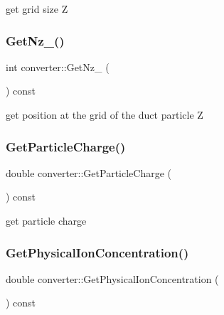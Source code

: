 get grid size Z 

\mbox{\label{classconverter_afb26f3a944dc5bf3d0ec0bf1ab5e278d}} 
\subsubsection{\texorpdfstring{Get\+Nz\+\_()}{GetNz\_0()}}
{\footnotesize\ttfamily int converter\+::\+Get\+Nz\+\_ (\begin{DoxyParamCaption}{ }\end{DoxyParamCaption}) const}



get position at the grid of the duct particle Z 

\mbox{\label{classconverter_a4c56e589a4a71b7421a2523cb471b747}} 
\subsubsection{\texorpdfstring{Get\+Particle\+Charge()}{GetParticleCharge()}}
{\footnotesize\ttfamily double converter\+::\+Get\+Particle\+Charge (\begin{DoxyParamCaption}{ }\end{DoxyParamCaption}) const}



get particle charge 

\mbox{\label{classconverter_a87a37cd0526fafb393e1fcf74a0884da}} 
\subsubsection{\texorpdfstring{Get\+Physical\+Ion\+Concentration()}{GetPhysicalIonConcentration()}}
{\footnotesize\ttfamily double converter\+::\+Get\+Physical\+Ion\+Concentration (\begin{DoxyParamCaption}{ }\end{DoxyParamCaption}) const}



